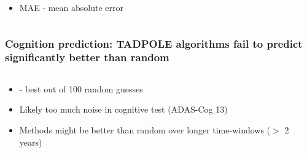 \documentclass[8pt,xcolor=table,aspectratio=169]{beamer}
\begin{document}
\begin{frame}
\begin{columns}[t]
\begin{column}{0.4\textwidth}
\begin{itemize}
 \item MAE - mean absolute error
\end{itemize}

\end{column}
\end{columns}





\end{frame}



\begin{frame}
\frametitle{\textbf{Cognition prediction:} TADPOLE algorithms \textbf{fail to predict} significantly better than random}


\begin{columns}[t]
\begin{column}[t]{0.5\textwidth}
 \begin{itemize}
 \item {} - best out of 100 random guesses

 \vspace{2em}

 \item Likely too much noise in cognitive test (ADAS-Cog 13)
 
 \vspace{2em}
 
 \item Methods might be better than random over longer time-windows ($>$ 2 years)
\end{itemize}
\end{column}
\begin{column}[t]{0.4\textwidth}
 

\end{column}
\end{columns}
\end{frame}
\end{document}
